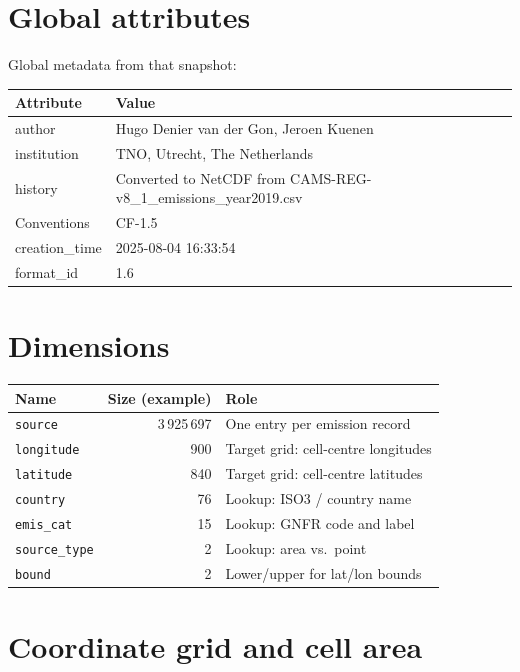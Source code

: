 \documentclass[11pt,a4paper]{article}
\begin{document}
\section{Global attributes}

Global metadata from that snapshot:

\begin{center}
\begin{tabular}{ll}
  \toprule
  Attribute & Value \\
  \midrule
  author & Hugo Denier van der Gon, Jeroen Kuenen \\
  institution & TNO, Utrecht, The Netherlands \\
  history & Converted to NetCDF from CAMS-REG-v8\_1\_emissions\_year2019.csv \\
  Conventions & CF-1.5 \\
  creation\_time & 2025-08-04 16:33:54 \\
  format\_id & 1.6 \\
  \bottomrule
\end{tabular}
\end{center}

\section{Dimensions}

\begin{center}
\begin{tabular}{lrl}
  \toprule
  Name & Size (example) & Role \\
  \midrule
  \texttt{source} & 3\,925\,697 & One entry per emission record \\
  \texttt{longitude} & 900 & Target grid: cell-centre longitudes \\
  \texttt{latitude} & 840 & Target grid: cell-centre latitudes \\
  \texttt{country} & 76 & Lookup: ISO3 / country name \\
  \texttt{emis\_cat} & 15 & Lookup: GNFR code and label \\
  \texttt{source\_type} & 2 & Lookup: area vs.\ point \\
  \texttt{bound} & 2 & Lower/upper for lat/lon bounds \\
  \bottomrule
\end{tabular}
\end{center}

\section{Coordinate grid and cell area}
\end{document}

